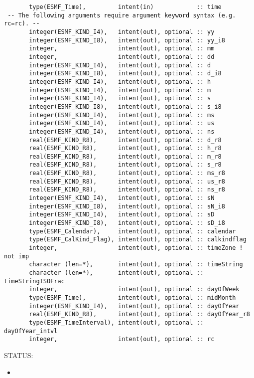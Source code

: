 \begin{verbatim}       type(ESMF_Time),         intent(in)            :: time
 -- The following arguments require argument keyword syntax (e.g. rc=rc). --
       integer(ESMF_KIND_I4),   intent(out), optional :: yy
       integer(ESMF_KIND_I8),   intent(out), optional :: yy_i8
       integer,                 intent(out), optional :: mm
       integer,                 intent(out), optional :: dd
       integer(ESMF_KIND_I4),   intent(out), optional :: d
       integer(ESMF_KIND_I8),   intent(out), optional :: d_i8
       integer(ESMF_KIND_I4),   intent(out), optional :: h
       integer(ESMF_KIND_I4),   intent(out), optional :: m
       integer(ESMF_KIND_I4),   intent(out), optional :: s
       integer(ESMF_KIND_I8),   intent(out), optional :: s_i8
       integer(ESMF_KIND_I4),   intent(out), optional :: ms
       integer(ESMF_KIND_I4),   intent(out), optional :: us
       integer(ESMF_KIND_I4),   intent(out), optional :: ns
       real(ESMF_KIND_R8),      intent(out), optional :: d_r8
       real(ESMF_KIND_R8),      intent(out), optional :: h_r8
       real(ESMF_KIND_R8),      intent(out), optional :: m_r8
       real(ESMF_KIND_R8),      intent(out), optional :: s_r8
       real(ESMF_KIND_R8),      intent(out), optional :: ms_r8
       real(ESMF_KIND_R8),      intent(out), optional :: us_r8
       real(ESMF_KIND_R8),      intent(out), optional :: ns_r8
       integer(ESMF_KIND_I4),   intent(out), optional :: sN
       integer(ESMF_KIND_I8),   intent(out), optional :: sN_i8
       integer(ESMF_KIND_I4),   intent(out), optional :: sD
       integer(ESMF_KIND_I8),   intent(out), optional :: sD_i8
       type(ESMF_Calendar),     intent(out), optional :: calendar
       type(ESMF_CalKind_Flag), intent(out), optional :: calkindflag
       integer,                 intent(out), optional :: timeZone ! not imp
       character (len=*),       intent(out), optional :: timeString
       character (len=*),       intent(out), optional :: timeStringISOFrac
       integer,                 intent(out), optional :: dayOfWeek
       type(ESMF_Time),         intent(out), optional :: midMonth
       integer(ESMF_KIND_I4),   intent(out), optional :: dayOfYear
       real(ESMF_KIND_R8),      intent(out), optional :: dayOfYear_r8
       type(ESMF_TimeInterval), intent(out), optional :: dayOfYear_intvl
       integer,                 intent(out), optional :: rc
 \end{verbatim}
{\sf STATUS:}
   \begin{itemize}
   \item{}
   \end{itemize}
  
